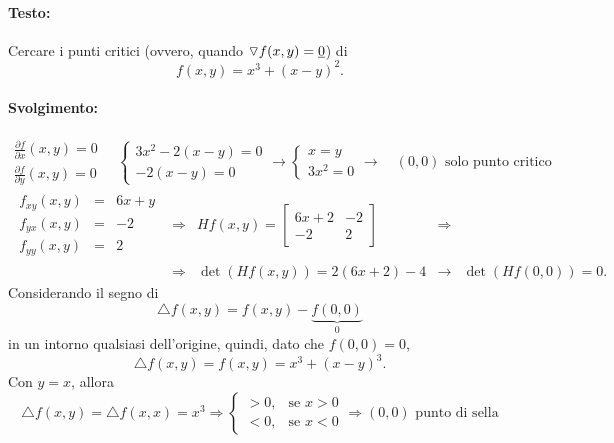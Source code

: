 \begin{example}[Ricerca punti critici con $\det(Hf(x_0, y_0))=0$]
	\leavevmode\paragraph{Testo:} Cercare i punti critici (ovvero, quando $\triangledown f(x,y)=\uline 0$) di
	\begin{equation*}
		f(x,y)=x^3+(x-y)^2.
	\end{equation*}
	\paragraph{Svolgimento:}
	\begin{equation*}
		\begin{matrix}
			\frac{\partial f}{\partial x}(x,y)=0\\
			\frac{\partial f}{\partial y}(x,y)=0
		\end{matrix}\quad
		\begin{cases}
			3x^2 - 2(x-y) = 0\\
			-2(x-y) = 0
		\end{cases}\rightarrow
		\begin{cases}
			x = y\\
			3x^2 = 0
		\end{cases}\rightarrow\quad (0,0)\text{ solo punto critico}
	\end{equation*}
	\begin{equation*}
		\begin{matrix}
			\begin{matrix}
				f_{xy}(x,y)&=&6x+y\\
				f_{yx}(x,y) &=& -2\\
				f_{yy}(x,y) &=& 2
			\end{matrix}&\Rightarrow&
			Hf(x,y)=
			\begin{bmatrix}
				6x+2 & -2\\
				-2 & 2
			\end{bmatrix}&\Rightarrow&\\
			&\Rightarrow&
			\det(Hf(x,y)) = 2(6x+2)-4 &\rightarrow& \det(Hf(0,0))=0.
		\end{matrix}
	\end{equation*}
	Considerando il segno di 
	\begin{equation*}
		\triangle f(x,y) = f(x,y) - \underbrace{f(0,0)}_{0}
	\end{equation*}
	in un intorno qualsiasi dell'origine, quindi, dato che $f(0,0)=0$,
	\begin{equation}\label{eq:funzione_es_cambio_segno}
		\triangle f(x,y) = f(x,y) = x^3 + (x-y)^3.
	\end{equation}
	Con $y=x$, allora
	\begin{equation}\label{eq:es_cambio_segno}
		\triangle f(x,y)=\triangle f(x,x) = x^3 \Rightarrow
		\begin{cases}
			> 0, & \text{se } x>0\\
			< 0, & \text{se } x<0
		\end{cases}\Rightarrow(0,0) \text{ punto di sella}
	\end{equation}
\end{example}

